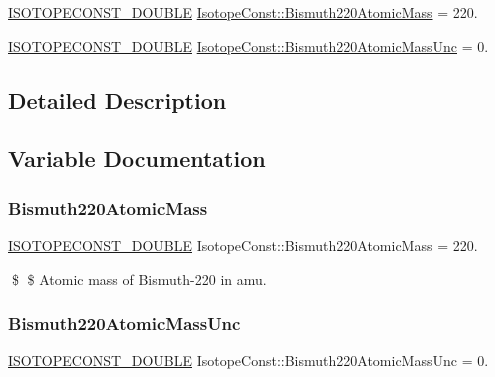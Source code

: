 \begin{DoxyCompactItemize}
\item 
\mbox{\hyperlink{group___isotope_const-_macros_ga8f45a7272ce02c0b4c65c44636ed719a}{I\+S\+O\+T\+O\+P\+E\+C\+O\+N\+S\+T\+\_\+\+D\+O\+U\+B\+LE}} \mbox{\hyperlink{group___isotope_const-_bismuth-_bi220_ga093329616153ab598433fbd216efea9d}{Isotope\+Const\+::\+Bismuth220\+Atomic\+Mass}} = 220.
\item 
\mbox{\hyperlink{group___isotope_const-_macros_ga8f45a7272ce02c0b4c65c44636ed719a}{I\+S\+O\+T\+O\+P\+E\+C\+O\+N\+S\+T\+\_\+\+D\+O\+U\+B\+LE}} \mbox{\hyperlink{group___isotope_const-_bismuth-_bi220_ga0f843d83151165c02e011e7f2f13fc23}{Isotope\+Const\+::\+Bismuth220\+Atomic\+Mass\+Unc}} = 0.
\end{DoxyCompactItemize}


\subsection{Detailed Description}


\subsection{Variable Documentation}
\mbox{\label{group___isotope_const-_bismuth-_bi220_ga093329616153ab598433fbd216efea9d}} 
\subsubsection{\texorpdfstring{Bismuth220\+Atomic\+Mass}{Bismuth220AtomicMass}}
{\footnotesize\ttfamily \mbox{\hyperlink{group___isotope_const-_macros_ga8f45a7272ce02c0b4c65c44636ed719a}{I\+S\+O\+T\+O\+P\+E\+C\+O\+N\+S\+T\+\_\+\+D\+O\+U\+B\+LE}} Isotope\+Const\+::\+Bismuth220\+Atomic\+Mass = 220.}

\$ \$ Atomic mass of Bismuth-\/220 in amu. \mbox{\label{group___isotope_const-_bismuth-_bi220_ga0f843d83151165c02e011e7f2f13fc23}} 
\subsubsection{\texorpdfstring{Bismuth220\+Atomic\+Mass\+Unc}{Bismuth220AtomicMassUnc}}
{\footnotesize\ttfamily \mbox{\hyperlink{group___isotope_const-_macros_ga8f45a7272ce02c0b4c65c44636ed719a}{I\+S\+O\+T\+O\+P\+E\+C\+O\+N\+S\+T\+\_\+\+D\+O\+U\+B\+LE}} Isotope\+Const\+::\+Bismuth220\+Atomic\+Mass\+Unc = 0.}

